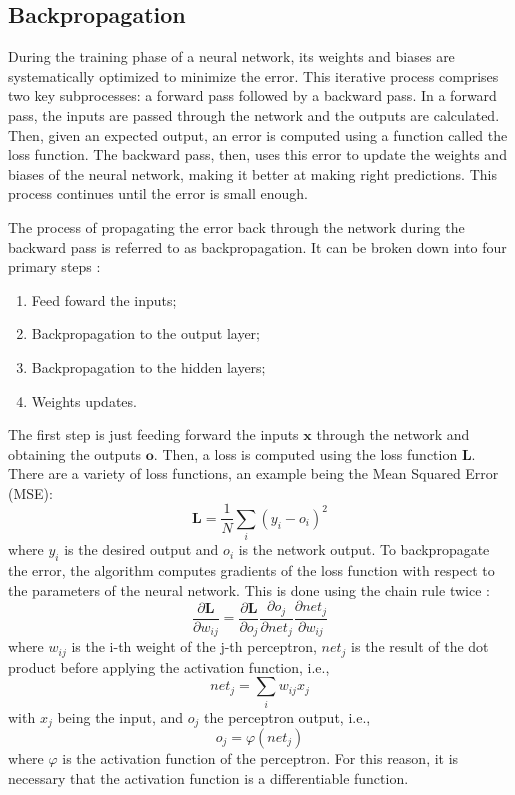 \subsection{Backpropagation} \label{sec-backpropagation}

During the training phase of a neural network, its weights and biases are systematically optimized to minimize the error. This iterative process comprises two key subprocesses: a forward pass followed by a backward pass. In a forward pass, the inputs are passed through the network and the outputs are calculated. Then, given an expected output, an error is computed using a function called the loss function. The backward pass, then, uses this error to update the weights and biases of the neural network, making it better at making right predictions. This process continues until the error is small enough.

The process of propagating the error back through the network during the backward pass is referred to as backpropagation. It can be broken down into four primary steps \cite{cilimkovic2015neural}:

\begin{enumerate}
    \item Feed foward the inputs;
    \item Backpropagation to the output layer;
    \item Backpropagation to the hidden layers;
    \item Weights updates.
\end{enumerate}

The first step is just feeding forward the inputs $\mathbf{x}$ through the network and obtaining the outputs $\mathbf{o}$. Then, a loss is computed using the loss function $\mathbf{L}$. There are a variety of loss functions, an example being the Mean Squared Error (MSE):
\begin{equation}
    \mathbf{L} = \frac{1}{N} \sum_{i} \left(y_i-o_i\right)^2
\end{equation}
where $y_i$ is the desired output and $o_i$ is the network output. To backpropagate the error, the algorithm computes gradients of the loss function with respect to the parameters of the neural network. This is done using the chain rule twice \cite{Roth_2016}:
\begin{equation}
    \frac{\partial \mathbf{L}}{\partial w_{ij}} = \frac{\partial \mathbf{L}}{\partial o_j}
    \frac{\partial o_j}{\partial net_j}\frac{\partial net_j}{\partial w_{ij}}
\end{equation}
where $w_{ij}$ is the i-th weight of the j-th perceptron, $net_j$ is the result of the dot product before applying the activation function, i.e.,
\begin{equation}
    net_j = \sum_i w_{ij} x_j
\end{equation}
with $x_j$ being the input, and $o_j$ the perceptron output, i.e.,
\begin{equation}
    o_j = \varphi (net_j)    
\end{equation}
where $\varphi$ is the activation function of the perceptron. For this reason, it is necessary that the activation function is a differentiable function. 

